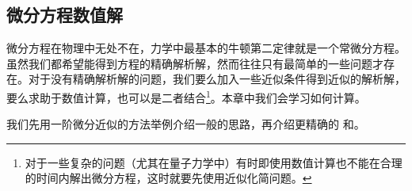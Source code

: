 \subsection{微分方程数值解}
微分方程在物理中无处不在，力学中最基本的牛顿第二定律就是一个常微分方程。虽然我们都希望能得到方程的精确解析解，然而往往只有最简单的一些问题才存在。对于没有精确解析解的问题，我们要么加入一些近似条件得到近似的解析解，要么求助于数值计算，也可以是二者结合\footnote{对于一些复杂的问题（尤其在量子力学中）有时即使用数值计算也不能在合理的时间内解出微分方程，这时就要先使用近似化简问题。}。本章中我们会学习如何计算。

我们先用一阶微分近似的方法举例介绍一般的思路，再介绍更精确的 和。


